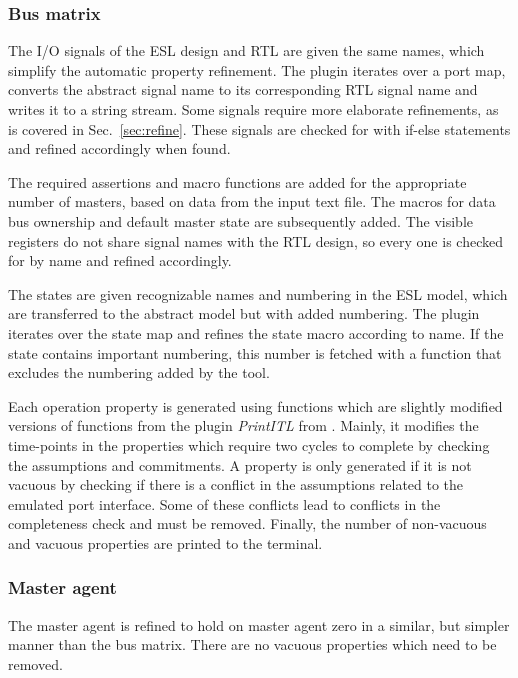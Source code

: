 \subsubsection{Bus matrix}
The I/O signals of the ESL design and RTL are given the same names, which simplify the automatic property refinement. The plugin iterates over a port map, converts the abstract signal name to its corresponding RTL signal name and writes it to a string stream. Some signals require more elaborate refinements, as is covered in Sec.~\ref{sec:refine}. These signals are checked for with if-else statements and refined accordingly when found. \par
The required assertions and macro functions are added for the appropriate number of masters, based on data from the input text file. The macros for data bus ownership and default master state are subsequently added. The visible registers do not share signal names with the RTL design, so every one is checked for by name and refined accordingly. \par
The states are given recognizable names and numbering in the ESL model, which are transferred to the abstract model but with added numbering. The plugin iterates over the state map and refines the state macro according to name. If the state contains important numbering, this number is fetched with a function that excludes the numbering added by the tool. \par
Each operation property is generated using functions which are slightly modified versions of functions from the plugin \textit{PrintITL} from \cite{descam}. Mainly, it modifies the time-points in the properties which require two cycles to complete by checking the assumptions and commitments. A property is only generated if it is not vacuous by checking if there is a conflict in the assumptions related to the emulated port interface. Some of these conflicts lead to conflicts in the completeness check and must be removed. Finally, the number of non-vacuous and vacuous properties are printed to the terminal.\par

\subsubsection{Master agent}
The master agent is refined to hold on master agent zero in a similar, but simpler manner than the bus matrix. There are no vacuous properties which need to be removed. 



